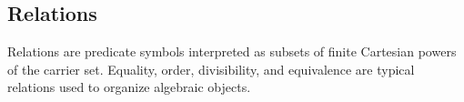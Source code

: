 \subsection{Relations}
\label{subsec:structure-relations}

\begin{remark*}[Exposition]
Relations are predicate symbols interpreted as subsets of finite Cartesian
powers of the carrier set.  Equality, order, divisibility, and equivalence are
typical relations used to organize algebraic objects.
\end{remark*}
